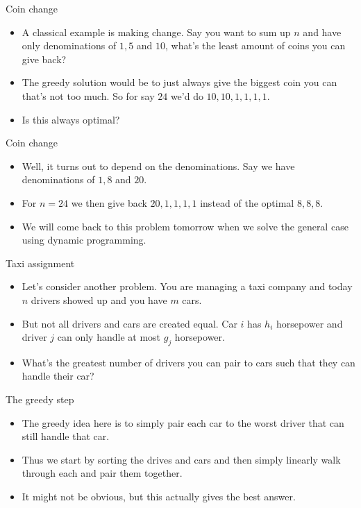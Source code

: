 \documentclass{beamer}
\begin{document}
\begin{frame}[plain]{Coin change}
    \begin{itemize}
        \item A classical example is making change. Say you want to sum up $n$ and have only denominations of $1, 5$ and $10$, what's the least amount of coins you can give back?
        \item The greedy solution would be to just always give the biggest coin you can that's not too much. So for say $24$ we'd do $10, 10, 1, 1, 1, 1$.
        \item Is this always optimal?
    \end{itemize}
\end{frame}

\begin{frame}[plain]{Coin change}
    \begin{itemize}
        \item Well, it turns out to depend on the denominations. Say we have denominations of $1, 8$ and $20$.
        \item For $n = 24$ we then give back $20, 1, 1, 1, 1$ instead of the optimal $8, 8, 8$.
        \item We will come back to this problem tomorrow when we solve the general case using dynamic programming.
    \end{itemize}
\end{frame}

\begin{frame}[plain]{Taxi assignment}
    \begin{itemize}
        \item Let's consider another problem. You are managing a taxi company and today $n$ drivers showed up and you have $m$ cars. 
        \item But not all drivers and cars are created equal. Car $i$ has $h_i$ horsepower and driver $j$ can only handle at most $g_j$ horsepower.
        \item What's the greatest number of drivers you can pair to cars such that they can handle their car?
    \end{itemize}
\end{frame}

\begin{frame}[plain]{The greedy step}
    \begin{itemize}
        \item The greedy idea here is to simply pair each car to the worst driver that can still handle that car.
        \item Thus we start by sorting the drives and cars and then simply linearly walk through each and pair them together.
        \item It might not be obvious, but this actually gives the best answer.
    \end{itemize}
\end{frame}
\end{document}
